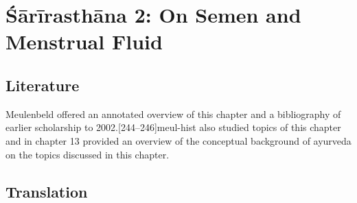 
\chapter{Śārīrasthāna 2:  On Semen and Menstrual Fluid}


\section{Literature} 

Meulenbeld offered an annotated overview of this chapter and a
bibliography of earlier scholarship to
2002.[244--246]{meul-hist}  \citet[chs 6--8]{das-2003} also
studied topics of this chapter and in chapter 13 provided an overview of
the conceptual background of ayurveda on the topics discussed in this
chapter.  

\section{Translation}

